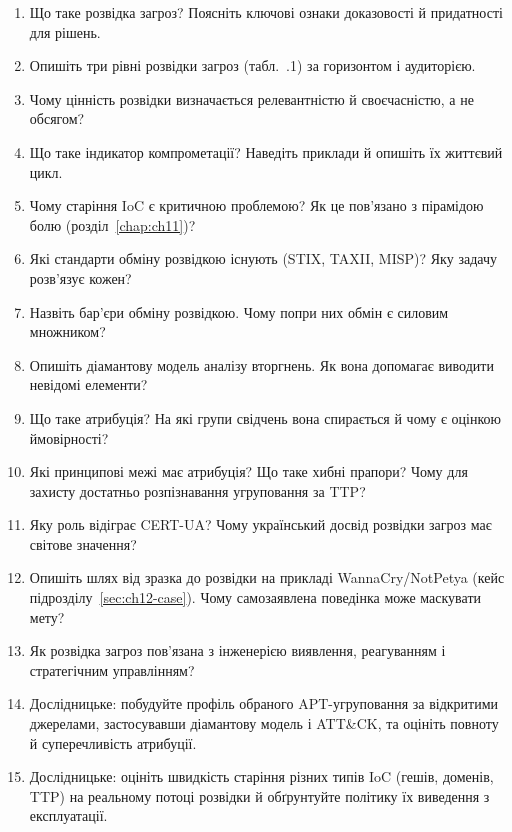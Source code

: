 \selfcheck
\begin{enumerate}
\item Що таке розвідка загроз? Поясніть ключові ознаки доказовості й придатності для рішень.
\item Опишіть три рівні розвідки загроз (табл.~\thechapter.1) за горизонтом і аудиторією.
\item Чому цінність розвідки визначається релевантністю й своєчасністю, а не обсягом?
\item Що таке індикатор компрометації? Наведіть приклади й опишіть їх життєвий цикл.
\item Чому старіння IoC є критичною проблемою? Як це пов'язано з пірамідою болю (розділ~\ref{chap:ch11})?
\item Які стандарти обміну розвідкою існують (STIX, TAXII, MISP)? Яку задачу розв'язує кожен?
\item Назвіть бар'єри обміну розвідкою. Чому попри них обмін є силовим множником?
\item Опишіть діамантову модель аналізу вторгнень. Як вона допомагає виводити невідомі елементи?
\item Що таке атрибуція? На які групи свідчень вона спирається й чому є оцінкою ймовірності?
\item Які принципові межі має атрибуція? Що таке хибні прапори? Чому для захисту достатньо розпізнавання угруповання за TTP?
\item Яку роль відіграє CERT-UA? Чому український досвід розвідки загроз має світове значення?
\item Опишіть шлях від зразка до розвідки на прикладі WannaCry/NotPetya (кейс підрозділу~\ref{sec:ch12-case}). Чому самозаявлена поведінка може маскувати мету?
\item Як розвідка загроз пов'язана з інженерією виявлення, реагуванням і стратегічним управлінням?
\item Дослідницьке: побудуйте профіль обраного APT-угруповання за відкритими джерелами, застосувавши діамантову модель і ATT\&CK, та оцініть повноту й суперечливість атрибуції.
\item Дослідницьке: оцініть швидкість старіння різних типів IoC (гешів, доменів, TTP) на реальному потоці розвідки й обґрунтуйте політику їх виведення з експлуатації.
\end{enumerate}

